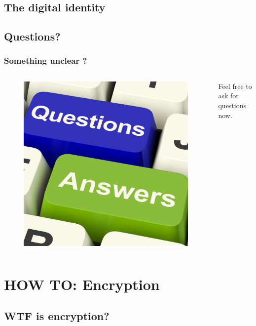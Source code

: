 \documentclass{beamer}
\begin{document}
\subsection{The digital identity}
\begin{frame}
\end{frame}

\subsection{Questions?}
\begin{frame}
\frametitle{Something unclear ?}
\begin{columns}[c]
\begin{figure}
\includegraphics[width=0.8\linewidth]{questions}
\end{figure}
Feel free to ask for questions now.
\end{columns}
\end{frame}

\section{HOW TO: Encryption}
\subsection{WTF is encryption?}
\begin{frame}
\end{frame}
\end{document}
